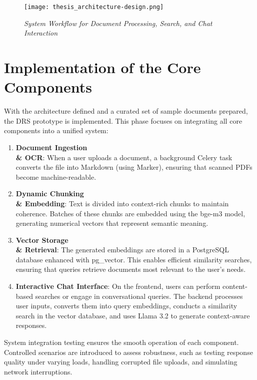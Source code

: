 \begin{figure}[ht]
    \centering
    \texttt{[image: thesis\_architecture-design.png]} %
    \caption{\textit{System Workflow for Document Processing, Search, and Chat Interaction}}
    \label{fig:system-workflow}
\end{figure}

\section{Implementation of the Core Components}

\noindent With the architecture defined and a curated set of sample documents prepared, the DRS prototype is implemented. This phase focuses on integrating all core components into a unified system:

\begin{enumerate}
    \item \textbf{Document Ingestion \\& OCR}: When a user uploads a document, a background Celery task converts the file into Markdown (using Marker), ensuring that scanned PDFs become machine-readable.

    \item \textbf{Dynamic Chunking \\& Embedding}: Text is divided into context-rich chunks to maintain coherence. Batches of these chunks are embedded using the bge-m3 model, generating numerical vectors that represent semantic meaning.

    \item \textbf{Vector Storage \\& Retrieval}: The generated embeddings are stored in a PostgreSQL database enhanced with pg\_vector. This enables efficient similarity searches, ensuring that queries retrieve documents most relevant to the user’s needs.

    \item \textbf{Interactive Chat Interface}: On the frontend, users can perform content-based searches or engage in conversational queries. The backend processes user inputs, converts them into query embeddings, conducts a similarity search in the vector database, and uses Llama 3.2 to generate context-aware responses.
\end{enumerate}

\noindent System integration testing ensures the smooth operation of each component. Controlled scenarios are introduced to assess robustness, such as testing response quality under varying loads, handling corrupted file uploads, and simulating network interruptions.


